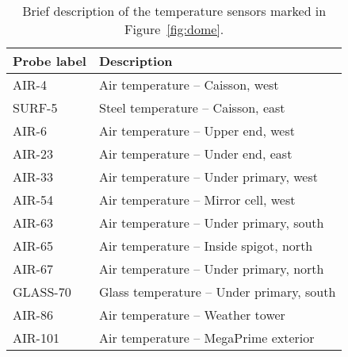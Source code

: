 \begin{table}
    \centering
    \caption{Brief description of the temperature sensors marked in Figure~\ref{fig:dome}.}
    \label{tab:description_of_tempsensors}
    \begin{tabular}{ll}
        \toprule
        Probe label & Description\\ \midrule
        AIR-4 & Air temperature -- Caisson, west \\
        SURF-5 & Steel temperature -- Caisson, east \\
        AIR-6 & Air temperature -- Upper end, west \\
        AIR-23 & Air temperature -- Under end, east \\
        AIR-33 & Air temperature -- Under primary, west \\
        AIR-54 & Air temperature -- Mirror cell, west \\
        AIR-63 & Air temperature -- Under primary, south \\
        AIR-65 & Air temperature -- Inside spigot, north \\
        AIR-67 & Air temperature -- Under primary, north \\
        GLASS-70 & Glass temperature -- Under primary, south \\
        AIR-86 & Air temperature -- Weather tower \\
        AIR-101 & Air temperature -- MegaPrime exterior \\ \bottomrule
    \end{tabular}
\end{table}

